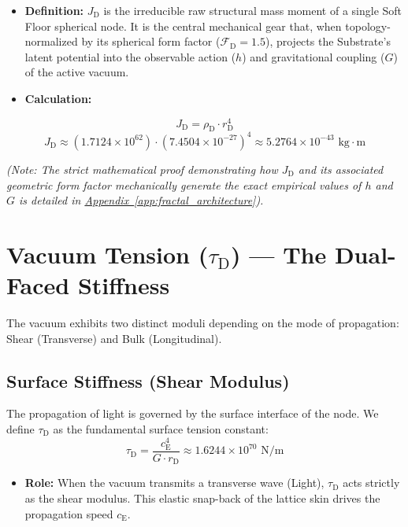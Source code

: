 \begin{itemize}
    \item \textbf{Definition:} $J_{\mathrm{D}}$ is the irreducible raw structural mass moment of a single Soft Floor spherical node. It is the central mechanical gear that, when topology-normalized by its spherical form factor ($\mathcal{F}_{\mathrm{D}} = 1.5$), projects the Substrate's latent potential into the observable action ($h$) and gravitational coupling ($G$) of the active vacuum.
    \item \textbf{Calculation:}
\end{itemize}
\begin{equation}
    J_{\mathrm{D}} = \rho_{\mathrm{D}} \cdot r_{\mathrm{D}}^4
\end{equation}
\begin{equation}
    J_{\mathrm{D}} \approx (1.7124 \times 10^{62}) \cdot (7.4504 \times 10^{-27})^4 \approx 5.2764 \times 10^{-43} \text{ kg}\cdot\text{m}
\end{equation}

\textit{(Note: The strict mathematical proof demonstrating how $J_{\mathrm{D}}$ and its associated geometric form factor mechanically generate the exact empirical values of $h$ and $G$ is detailed in \hyperref[app:fractal_architecture]{Appendix~\ref*{app:fractal_architecture}}).}

\section{Vacuum Tension ($\tau_{\mathrm{D}}$) --- The Dual-Faced Stiffness}
The vacuum exhibits two distinct moduli depending on the mode of propagation: Shear (Transverse) and Bulk (Longitudinal).

\subsection{Surface Stiffness (Shear Modulus)}
The propagation of light is governed by the surface interface of the node. We define $\tau_{\mathrm{D}}$ as the fundamental surface tension constant:
\begin{equation}
    \tau_{\mathrm{D}} = \frac{c_{\mathrm{E}}^4}{G \cdot r_{\mathrm{D}}} \approx 1.6244 \times 10^{70} \text{ N/m}
\end{equation}
\begin{itemize}
    \item \textbf{Role:} When the vacuum transmits a transverse wave (Light), $\tau_{\mathrm{D}}$ acts strictly as the shear modulus. This elastic snap-back of the lattice skin drives the propagation speed $c_{\mathrm{E}}$.
\end{itemize}

